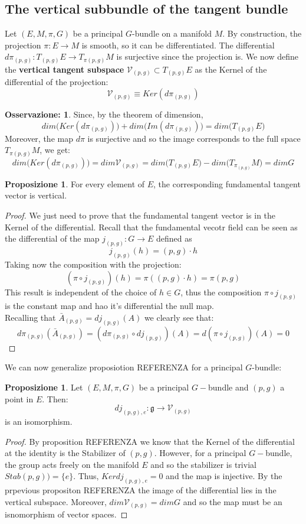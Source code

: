 \documentclass[12pt,a4paper]{report}
\theoremstyle{definition}
\theoremstyle{Theorem}
\newtheorem{Prop}[Def]{Proposizione}
\theoremstyle{definition}
\theoremstyle{definition}
\theoremstyle{definition}
\newtheorem{Obs}[Def]{Osservazione:}
\begin{document}
		\subsection{The vertical subbundle of the tangent bundle}
		Let $(E,M,\pi,G)$ be a principal $G$-bundle on a manifold $M$. By construction, the projection $\pi:E\rightarrow M$ is smooth, so it can be differentiated. The differential $d\pi_{(p,g)}:T_{(p,g)}E\rightarrow T_{\pi(p,g)}M$ is surjective since the projection is. We now define the \textbf{vertical tangent subspace} $\mathcal{V}_{(p,g)}\subset T_{(p,g)}E$ as the Kernel of the differential of the projection:
		$$\mathcal{V}_{(p,g)}\equiv Ker(d\pi_{(p,g)})$$
		\begin{Obs}
			Since, by the theorem of dimension, 
			$$dim \bigg(Ker(d\pi_{(p,g)})\bigg)+dim\bigg(Im(d\pi_{(p,g)})\bigg)=dim\bigg(T_{(p,g)}E\bigg)$$
			Moreover, the map $d\pi$ is surjective and so the image corresponds to the full space $T_{\pi(p,g)}M$, we get:
			$$dim \bigg(Ker(d\pi_{(p,g)})\bigg)=dim\mathcal{V}_{(p,g)}=dim\bigg(T_{(p,g)}E\bigg)-dim\bigg(T_{\pi_{(p,g)}}M\bigg)=dim G$$
		\end{Obs}
		\begin{Prop}
			For every element of $E$, the corresponding fundamental tangent vector is vertical.
		\end{Prop}
		\begin{proof}
			We just need to prove that the fundamental tangent vector is in the Kernel of the differential. Recall that the fundamental vecotr field can be seen as the differential of the map $j_{(p,g)}:G\rightarrow E$ defined as 
			$$j_{(p,g)}(h)=(p,g)\cdot h $$
			Taking now the composition with the projection:
			$$(\pi\circ j_{(p,g)})(h)=\pi((p,g)\cdot h)=\pi(p,g)$$
			This result is independent of the choice of $h\in G$, thus the composition $\pi\circ j_{(p,g)}$ is the constant map and hao it's differential the null map.\\
			Recalling that $\bar{A}_{(p,g)}=dj_{(p,g)}(A)$ we clearly see that:
			$$d\pi_{(p,g)}(\bar{A}_{(p,g)})=
			(d\pi_{(p,g)}\circ dj_{(p,g)})(A)=
			d(\pi\circ j_{(p,g)})(A)=0$$
		\end{proof}
		We can now generalize proposiotion REFERENZA for a principal $G$-bundle:
		\begin{Prop}
			Let $(E,M,\pi,G)$ be a principal $G-$bundle and $(p,g)$ a point in $E$. Then: 
			$$dj_{(p,g),e}:\mathfrak{g}\rightarrow \mathcal{V}_{(p,g)}$$ is an isomorphism.
		\end{Prop}
		\begin{proof}
			By proposition REFERENZA we know that the Kernel of the differential at the identity is the Stabilizer of $(p,g)$. However, for a principal $G-$bundle, the group acts freely on the manifold $E$ and so the stabilizer is trivial $Stab(p,g))=\{e\}$. Thus, $Ker dj_{(p,g),e}=0$ and the map is injective. By the prpevious propositon REFERENZA the image of the differential lies in the vertical subspace. Moreover, $dim\mathcal{V}_{(p,g)}=dim G$ and so the map must be an isnomorphism of vector spaces.			
		\end{proof}
\end{document}
